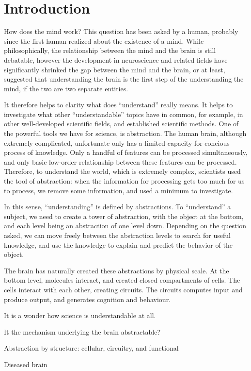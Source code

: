 \chapter{Introduction}

How does the mind work? This question has been asked by a human, probably since the first human realized about the existence of a mind. While philosophically, the relationship between the mind and the brain is still debatable, however the development in neuroscience and related fields have significantly shrinked the gap between the mind and the brain, or at least, suggested that understanding the brain is the first step of the understanding the mind, if the two are two separate entities. 

It therefore helps to clarity what does ``understand'' really means. It helps to investigate what other ``understandable'' topics have in common, for example, in other well-developed scientific fields, and established scientific methods. One of the powerful tools we have for science, is abstraction. The human brain, although extremely complicated, unfortunate only has a limited capacity for concious process of knowledge. Only a handful of features can be processed simultaneously, and only basic low-order relationship between these features can be processed. Therefore, to understand the world, which is extremely complex, scientists used the tool of abstraction: when the information for processing gets too much for us to process, we remove some information, and used a minimum to investigate. 

In this sense, ``understanding'' is defined by abstractions. To ``understand'' a subject, we need to create a tower of abstraction, with the object at the bottom, and each level being an abstraction of one level down. Depending on the question asked, we can move freely between the abstraction levels to search for useful knowledge, and use the knowledge to explain and predict the behavior of the object. 

The brain has naturally created these abstractions by physical scale. At the bottom level, molecules interact, and created closed compartments of cells. The cells interact with each other, creating circuits. The circuits computes input and produce output, and generates cognition and behaviour. 



It is a wonder how science is understandable at all. 

It the mechanism underlying the brain abstractable?

Abstraction by structure:
    cellular, circuitry, and functional

Diseased brain


